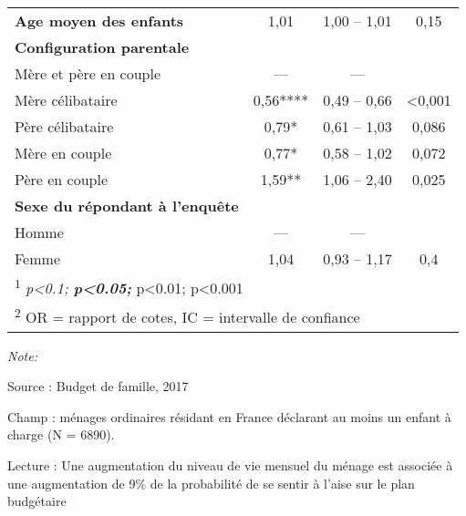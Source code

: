 \documentclass[
  12pt,
]{book}
\begin{document}
\begin{table}[!h]
\begin{threeparttable}
\begin{tabular}[t]{lccc}
\addlinespace
\textbf{Age moyen des enfants} & 1,01 & 1,00 – 1,01 & 0,15\\
\textbf{Configuration parentale} &  &  & \\
\hspace{1em}Mère et père en couple & — & — & \\
\hspace{1em}Mère célibataire & 0,56**** & 0,49 – 0,66 & <0,001\\
\hspace{1em}Père célibataire & 0,79* & 0,61 – 1,03 & 0,086\\
\addlinespace
\hspace{1em}Mère en couple & 0,77* & 0,58 – 1,02 & 0,072\\
\hspace{1em}Père en couple & 1,59** & 1,06 – 2,40 & 0,025\\
\textbf{Sexe du répondant à l'enquête} &  &  & \\
\hspace{1em}Homme & — & — & \\
\hspace{1em}Femme & 1,04 & 0,93 – 1,17 & 0,4\\
\bottomrule
\multicolumn{4}{l}{\rule{0pt}{1em}\textsuperscript{1} \textit{p<0.1; \textbf{p<0.05; }}p<0.01; \textbf{}p<0.001}\\
\multicolumn{4}{l}{\rule{0pt}{1em}\textsuperscript{2} OR = rapport de cotes, IC = intervalle de confiance}\\
\end{tabular}
\begin{tablenotes}
\item \textit{Note: } 
\item Source : Budget de famille, 2017
\item Champ : ménages ordinaires résidant en France déclarant au moins un enfant à charge (N = 6890).
\item Lecture : Une augmentation du niveau de vie mensuel du ménage est associée à une augmentation de 9\% de la probabilité de se sentir à l'aise sur le plan budgétaire
\end{tablenotes}
\end{threeparttable}
\end{table}
\end{document}
